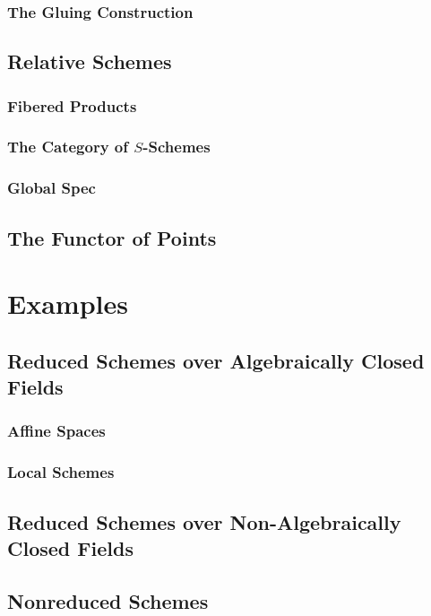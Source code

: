 \documentclass[oneside]{amsbook}
\numberwithin{ex}{chapter}
\begin{document}
\subsection{The Gluing Construction}


\section{Relative Schemes}
\subsection{Fibered Products}

\subsection{The Category of $S$-Schemes}

\subsection{Global Spec}


\section{The Functor of Points}


\chapter{Examples}
\section{Reduced Schemes over Algebraically Closed Fields}
\subsection{Affine Spaces}

\subsection{Local Schemes}


\section{Reduced Schemes over Non-Algebraically Closed Fields}


\section{Nonreduced Schemes}
\end{document}
